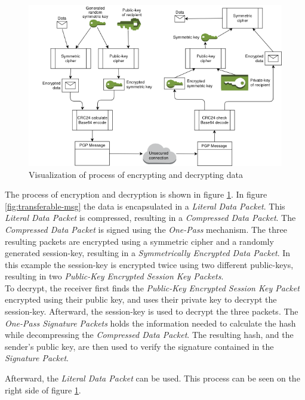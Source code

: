 \begin{figure}[h!]
	\centering
	\includegraphics[width=1\linewidth]{figures/encryption}
	\caption{Visualization of process of encrypting and decrypting data}
	\label{fig:encryption}
\end{figure}


The process of encryption and decryption is shown in figure \ref{fig:encryption}. In figure \ref{fig:transferable-msg} the data is encapsulated in a \textit{Literal Data Packet}. This \textit{Literal Data Packet} is compressed, resulting in a \textit{Compressed Data Packet}. The \textit{Compressed Data Packet} is signed using the \textit{One-Pass} mechanism. The three resulting packets are encrypted using a symmetric cipher and a randomly generated session-key, resulting in a \textit{Symmetrically Encrypted Data Packet}. In this example the session-key is encrypted twice using two different public-keys, resulting in two \textit{Public-Key Encrypted Session Key Packets}. \\


To decrypt, the receiver first finds the\textit{ Public-Key Encrypted Session Key Packet} encrypted using their public key, and uses their private key to decrypt the session-key. Afterward, the session-key is used to decrypt the three packets. The \textit{One-Pass Signature Packets} holds the information needed to calculate the hash while decompressing the \textit{Compressed Data Packet}. The resulting hash, and the sender's public key, are then used to verify the signature contained in the \textit{Signature Packet}. 

Afterward, the \textit{Literal Data Packet} can be used. This process can be seen on the right side of figure \ref{fig:encryption}.


